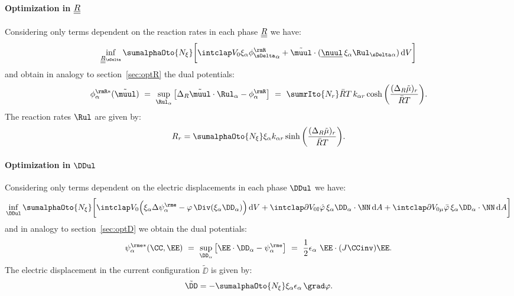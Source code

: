 \paragraph{Optimization in $\underline{\underline{R}}$} \label{sec:optR2} %
  Considering only terms dependent on the reaction rates in each phase $\underline{\underline{R}}$ we have:
  \begin{align}
    \inf_{\RullDelta} \sumalphaOto{\Nxi} \bigg[ \intVO \xia\phiRDeltaa + \muultilde \cdot (\nuull\,\xia\RulDeltaa) \dV \bigg]
    \label{eq:optR2}
  \end{align}
  and obtain in analogy to section~\ref{sec:optR} the dual potentials:
  \begin{align}
    \phiRs_\alpha(\muultilde) \ = \ \sup_{\Rula}\big[\Delta_R \muultilde \cdot \Rula-\phiRa\big] \ = \ \sumrIto{N_r} \RT \,k_{\alpha r}\cosh\bigg(\frac{(\Delta_R\tilde\mu)_r}{\RT}\bigg).
  \end{align}
  The reaction rates $\Rul$ are given by:
  \begin{align}
    R_r = \sumalphaOto{\Nxi} \xia k_{\alpha r} \sinh\bigg(\frac{(\Delta_R\tilde\mu)_r}{\RT}\bigg).
  \end{align}

  \paragraph{Optimization in $\DDul$} %
  Considering only terms dependent on the electric displacements in each phase $\DDul$ we have:
  \begin{align}
    \inf_{\DDul} \sumalphaOto{\Nxi}\bigg[ \intVO \Big(\xia\Delta\psiea - \varphi \, \Div(\xia\DDa)\Big) \dV 
    + \intdVOx{I} \hat\varphi \, \xia\DDa\cdot\NN\dA 
    + \intdVOx{\mu} \bar\varphi\,\xia\DDa\cdot\NN \dA \bigg]
    \label{eq:optD2}
  \end{align}
  and in analogy to section~\ref{sec:optD} we obtain the dual potentials:
  \begin{align}
    \psies_\alpha(\CC,\EE) \ = \ \sup_{\DDa} \big[ \EE\cdot\DDa - \psiea \big] \ = \ \frac{1}{2}\epsilon_\alpha \ \EE \cdot (J\CCinv)\EE.
  \end{align}
  The electric displacement in the current configuration $\tilde\DD$ is given by:
  \begin{align}
    \tilde\DD = -\sumalphaOto{\Nxi} \xia\epsilon_\alpha\,\grad\varphi.
  \end{align}

